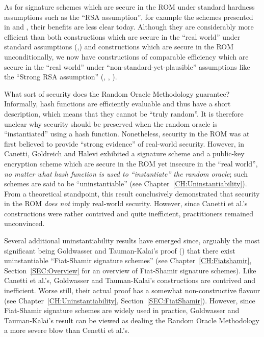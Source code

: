 As for signature schemes which are secure in the ROM under standard hardness
assumptions such as the ``RSA assumption'', for example the schemes presented
in \cite{bellare:rompractical} and \cite{bellare:oaep}, their benefits are
less clear today. Although they are considerably more efficient than both
constructions which are secure in the ``real world'' under standard
assumptions (\cite{dwork:fastsigs},\cite{cramer:fastsigs}) and constructions
which are secure in the ROM unconditionally, we now have constructions of
comparable efficiency which are secure in the ``real world'' under
``non-standard-yet-plausible'' assumptions like the ``Strong RSA assumption''
(\cite{cramer:signatures2}, \cite{gennaro:fastsigs},
\cite{fischlin:cramershoup}).

What sort of security does the Random Oracle Methodology guarantee?
Informally, hash functions are efficiently evaluable and thus have a short
description, which means that they cannot be ``truly random''. It is therefore
unclear why security should be preserved when the random oracle is
``instantiated'' using a hash function. Nonetheless, security in the ROM was
at first believed to provide ``strong evidence'' of real-world security.
However, in \cite{canetti:romfails} Canetti, Goldreich and Halevi exhibited a
signature scheme and a public-key encryption scheme which are secure in the
ROM yet insecure in the ``real world'', {\it no matter what hash function is
used to ``instantiate'' the random oracle}; such schemes are said to be
``uninstantiable'' (see Chapter~\ref{CH:Uninstantiability}).  From a
theoretical standpoint, this result conclusively demonstrated that security in
the ROM {\it does not} imply real-world security. However, since Canetti et
al.'s constructions were rather contrived 
and quite inefficient, practitioners remained unconvinced.

Several additional uninstantiability results have emerged since, arguably the
most significant being Goldwasser and Tauman-Kalai's proof
(\cite{goldwasser:fsparadigmfails}) that there exist uninstantiable
``Fiat-Shamir signature schemes'' (see Chapter~\ref{CH:Fiatshamir},
Section~\ref{SEC:Overview} for an overview of Fiat-Shamir signature
schemes). Like Canetti et al.'s, Goldwasser and Tauman-Kalai's constructions
are contrived and inefficient. Worse still, their actual proof has a
somewhat non-constructive flavour (see Chapter~\ref{CH:Uninstantiability},
Section~\ref{SEC:FiatShamir}). 
However, since Fiat-Shamir signature schemes are widely used in practice,
Goldwasser and Tauman-Kalai's result can be viewed as dealing the Random
Oracle Methodology a more severe blow than Cenetti et al.'s. 


